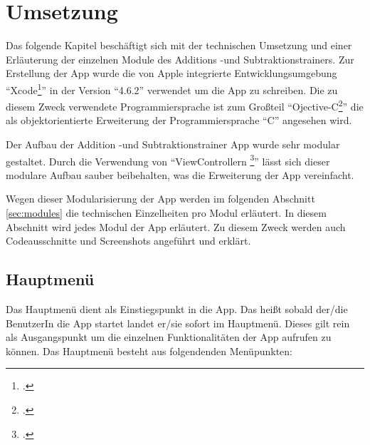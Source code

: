 
\chapter{Umsetzung}
\label{chap:impl}

Das folgende Kapitel beschäftigt sich mit der technischen Umsetzung und einer Erläuterung der einzelnen
Module des Additions -und Subtraktionstrainers. Zur Erstellung der App wurde die von Apple integrierte Entwicklungsumgebung 
\enquote{Xcode\footcite{http://developer.apple.com/xcode/ [Zugriff am 24.10.2013]}} in der Version \enquote{4.6.2} verwendet um die App zu schreiben.
Die zu diesem Zweck verwendete Programmiersprache ist zum Großteil 
\enquote{Ojective-C\footcite{http://www.gnu.org/software/gnustep/resources/documentation/Developer/Base/ProgrammingManual/manual_toc.html [Zugriff am 24.10.2013]}} die als
objektorientierte Erweiterung der Programmiersprache \enquote{C} angesehen wird.

Der Aufbau der Addition -und Subtraktionstrainer App wurde sehr modular gestaltet. Durch die Verwendung 
von \enquote{ViewControllern \footcite{http://developer.apple.com/library/ios/documentation/uikit/reference/UIViewController_Class/ [Zugriff am 24.10.2013]}}
lässt sich dieser modulare Aufbau sauber beibehalten, was die Erweiterung der App vereinfacht.

Wegen dieser Modularisierung der App werden im folgenden Abschnitt \ref{sec:modules} die technischen Einzelheiten pro Modul erläutert.
In diesem Abschnitt wird jedes Modul der App erläutert. Zu diesem Zweck werden auch Codeausschnitte 
und Screenshots angeführt und erklärt.
\section{Hauptmenü}
Das Hauptmenü dient als Einstiegspunkt in die App. Das heißt sobald der/die BenutzerIn die App startet
landet er/sie sofort im Hauptmenü. Dieses gilt rein als Ausgangspunkt um die einzelnen Funktionalitäten
der App aufrufen zu können. Das Hauptmenü besteht aus folgendenden Menüpunkten:


